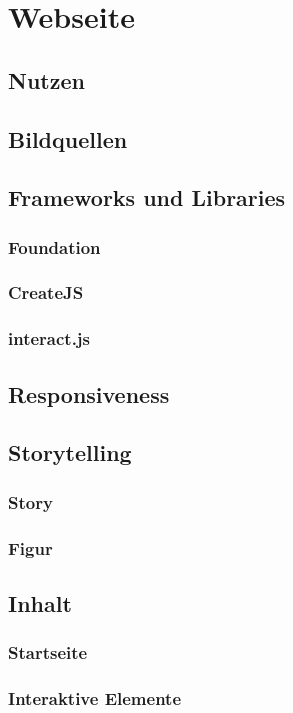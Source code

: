 \chapter{Webseite}
\section{Nutzen}
\section{Bildquellen}
\section{Frameworks und Libraries}
\subsection{Foundation}
\subsection{CreateJS}
\subsection{interact.js}
\section{Responsiveness}
\section{Storytelling}
\subsection{Story}
\subsection{Figur}

\section{Inhalt}
\subsection{Startseite}

\subsection{Interaktive Elemente}

